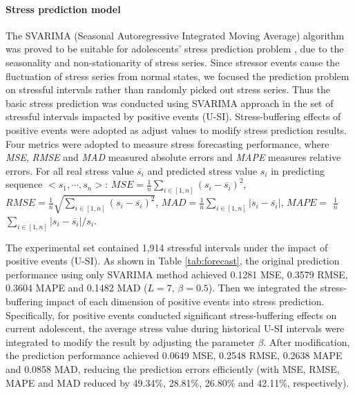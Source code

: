 \paragraph{Stress prediction model}
The SVARIMA (Seasonal Autoregressive Integrated Moving Average) algorithm was proved to be suitable for adolescents' stress prediction problem \citep{Li2015Predicting, Shumway2006Time},
due to the seasonality and non-stationarity of stress series.
Since stressor events cause the fluctuation of stress series from normal states,
we focused the prediction problem on stressful intervals rather than randomly picked out stress series.
Thus the basic stress prediction was conducted using SVARIMA approach in the set of stressful intervals impacted by positive events (U-SI).
Stress-buffering effects of positive events were adopted as adjust values to modify stress prediction results.
Four metrics were adopted to measure stress forecasting performance,
where \emph{MSE}, \emph{RMSE} and \emph{MAD} measured absolute errors and \emph{MAPE} measures relative errors.
For all real stress value $\overline{s_i}$ and predicted stress value $s_i$ in predicting sequence $<s_1,\cdots,s_n>$:
$MSE = \frac{1}{n}\sum_{i\in[1,n]}(s_i-\overline{s_i})^2$,
$RMSE = \frac{1}{n}\sqrt{\sum_{i\in[1,n]}(s_i-\overline{s_i})^2}$,
$MAD = \frac{1}{n}\sum_{i\in[1,n]}|s_i-\overline{s_i}|$,
$MAPE = $ $\frac{1}{n}$ $\sum_{i\in[1,n]}{|s_i-\overline{s_i}|/s_i}$.

The experimental set contained 1,914 stressful intervals under the impact of positive events (U-SI).
As shown in Table \ref{tab:forecast},
the original prediction performance using only SVARIMA method
achieved 0.1281 MSE, 0.3579 RMSE, 0.3604 MAPE and 0.1482 MAD ($L = 7$, $\beta = 0.5$).
Then we integrated the stress-buffering impact of each dimension of positive events into stress prediction.
Specifically, for positive events conducted significant stress-buffering effects on current adolescent,
the average stress value during historical U-SI intervals were integrated to modify the result by adjusting the parameter $\beta$.
After modification,
the prediction performance achieved 0.0649 MSE,	0.2548 RMSE, 0.2638 MAPE and 0.0858 MAD,
reducing the prediction errors efficiently (with MSE, RMSE, MAPE and MAD reduced by 49.34\%, 28.81\%, 26.80\% and 42.11\%, respectively).

